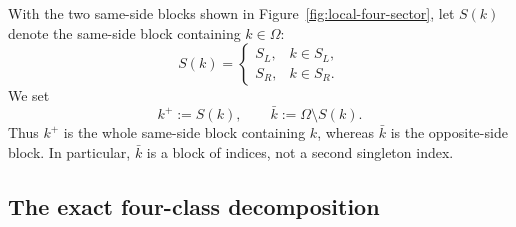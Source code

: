 \documentclass[11pt]{article}
\begin{document}
With the two same-side blocks shown in Figure~\ref{fig:local-four-sector}, let
$S(k)$ denote the same-side block containing $k\in\Omega$:
\[
S(k)=
\begin{cases}
S_L,& k\in S_L,\\
S_R,& k\in S_R.
\end{cases}
\]
We set
\[
k^+:=S(k),
\qquad
\bar k:=\Omega\setminus S(k).
\]
Thus $k^+$ is the whole same-side block containing $k$, whereas $\bar k$ is the opposite-side block.  In particular, $\bar k$ is a block of indices, not a second singleton index.


\subsection{The exact four-class decomposition}
\label{subsec:four-class-decomposition}
\end{document}
